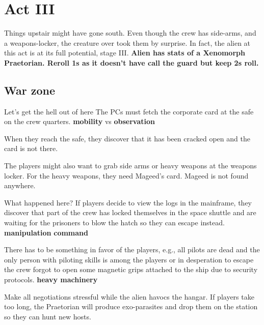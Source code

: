 \chapter{Act III}





\begin{rpg-commentbox}{}
    
    Things upstair might have gone south. Even though the crew has side-arms, and a weapons-locker, the creature over took them by surprise. In fact, the alien at this act is at its full potential, stage III. \textbf{Alien has stats of a Xenomorph Praetorian. Reroll 1s as it doesn't have call the guard but keep 2s roll.}

\end{rpg-commentbox}    



\section{War zone}


\begin{rpg-commentbox}{Let's get the hell out of here}
   The PCs must fetch the corporate card at the safe on the crew quarters. \textbf{mobility} vs \textbf{observation}

   When they reach the safe, they discover that it has been cracked open and the card is not there.

   \medskip

    The players might also want to grab side arms or heavy weapons at the weapons locker. For the heavy weapons, they need Mageed's card.
    Mageed is not found anywhere.
\end{rpg-commentbox}



\begin{rpg-commentbox}{What happened here?}
    If players decide to view the logs in the mainframe, they discover that part of the crew has locked themselves in the space shuttle and are waiting 
    for the prisoners to blow the hatch so they can escape instead. \textbf{manipulation} \textbf{command}

    There has to be something in favor of the players, e.g., all pilots are dead and the only person with piloting skills is among the players or in desperation to escape the crew forgot to open some magnetic grips attached to the ship due to security protocols. \textbf{heavy machinery}

    Make all negotiations stressful while the alien havocs the hangar. If players take too long, the Praetorian will produce exo-parasites and drop them on the station so they can hunt new hosts.
 \end{rpg-commentbox}


